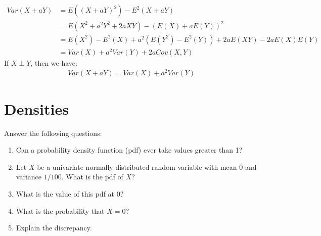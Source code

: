 \documentclass[submit]{harvardml}
\begin{document}
\begin{enumerate}[label=(\alph*)]
		\begin{align}
			Var(X + aY) &= E((X + aY)^2) - E^2(X + aY) \\
						&= E(X^2 + a^2 Y^2 + 2a XY) - (E(X) + aE(Y))^2 \\
						&= E(X^2) - E^2(X) + a^2 (E(Y^2) - E^2(Y)) + 2a E(XY) - 2a E(X)E(Y) \\
						&= Var(X) + a^2 Var(Y) + 2a Cov(X,Y)
		\end{align}
		If $X \perp Y$, then we have:
		\begin{align}
			Var(X + aY) = Var(X) + a^2 Var(Y)
		\end{align}
\end{enumerate}

\newpage
\section*{Densities}
\begin{problem}
Answer the following questions:
\begin{enumerate}[label=(\alph*)]
  \item Can a probability density function (pdf) ever take values greater than 1?
  \item Let $X$ be a univariate normally distributed random variable with mean 0
        and variance $1/100$. What is the pdf of $X$?
  \item What is the value of this pdf at 0?
  \item What is the probability that $X = 0$?
  \item Explain the discrepancy.
\end{enumerate}
\end{problem}
\end{document}
